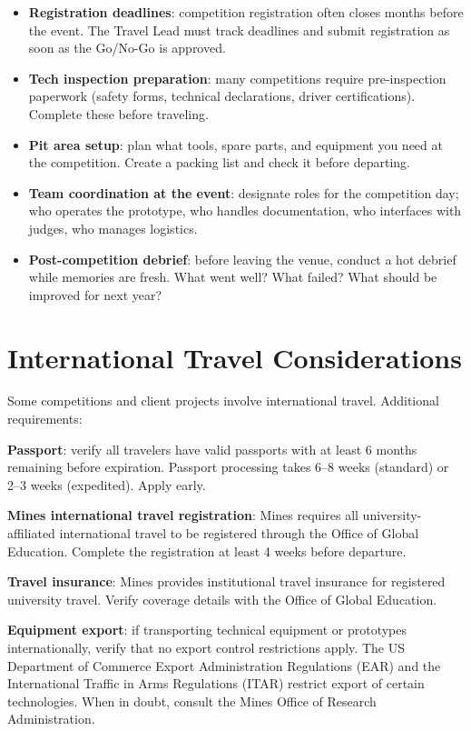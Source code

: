 \begin{itemize}[nosep,leftmargin=1.5em]
\item \textbf{Registration deadlines}: competition registration often closes months before the event. The Travel Lead must track deadlines and submit registration as soon as the Go/No-Go is approved.
\item \textbf{Tech inspection preparation}: many competitions require pre-inspection paperwork (safety forms, technical declarations, driver certifications). Complete these before traveling.
\item \textbf{Pit area setup}: plan what tools, spare parts, and equipment you need at the competition. Create a packing list and check it before departing.
\item \textbf{Team coordination at the event}: designate roles for the competition day; who operates the prototype, who handles documentation, who interfaces with judges, who manages logistics.
\item \textbf{Post-competition debrief}: before leaving the venue, conduct a hot debrief while memories are fresh. What went well? What failed? What should be improved for next year?
\end{itemize}



\section{International Travel Considerations}
Some competitions and client projects involve international travel. Additional requirements:

\textbf{Passport}: verify all travelers have valid passports with at least 6 months remaining before expiration. Passport processing takes 6--8 weeks (standard) or 2--3 weeks (expedited). Apply early.

\textbf{Mines international travel registration}: Mines requires all university-affiliated international travel to be registered through the Office of Global Education. Complete the registration at least 4 weeks before departure.

\textbf{Travel insurance}: Mines provides institutional travel insurance for registered university travel. Verify coverage details with the Office of Global Education.

\textbf{Equipment export}: if transporting technical equipment or prototypes internationally, verify that no export control restrictions apply. The US Department of Commerce Export Administration Regulations (EAR) and the International Traffic in Arms Regulations (ITAR) restrict export of certain technologies. When in doubt, consult the Mines Office of Research Administration.

